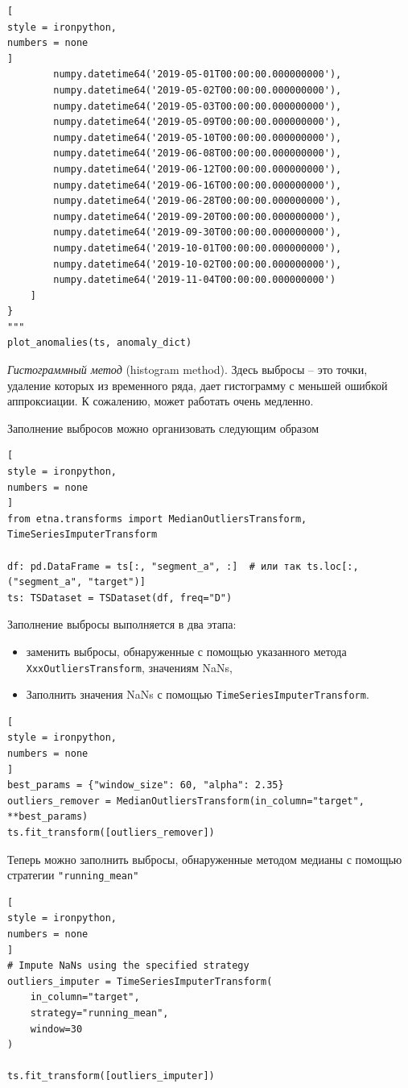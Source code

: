 \documentclass[%
	11pt,
	a4paper,
	utf8,
		]{article}
\begin{document}
\begin{lstlisting}[
style = ironpython,
numbers = none
]
		numpy.datetime64('2019-05-01T00:00:00.000000000'),
		numpy.datetime64('2019-05-02T00:00:00.000000000'),
		numpy.datetime64('2019-05-03T00:00:00.000000000'),
		numpy.datetime64('2019-05-09T00:00:00.000000000'),
		numpy.datetime64('2019-05-10T00:00:00.000000000'),
		numpy.datetime64('2019-06-08T00:00:00.000000000'),
		numpy.datetime64('2019-06-12T00:00:00.000000000'),
		numpy.datetime64('2019-06-16T00:00:00.000000000'),
		numpy.datetime64('2019-06-28T00:00:00.000000000'),
		numpy.datetime64('2019-09-20T00:00:00.000000000'),
		numpy.datetime64('2019-09-30T00:00:00.000000000'),
		numpy.datetime64('2019-10-01T00:00:00.000000000'),
		numpy.datetime64('2019-10-02T00:00:00.000000000'),
		numpy.datetime64('2019-11-04T00:00:00.000000000')
    ]
}
"""
plot_anomalies(ts, anomaly_dict)
\end{lstlisting}

\emph{Гистограммный метод} (histogram method). Здесь выбросы -- это точки, удаление которых из временного ряда, дает гистограмму с меньшей ошибкой аппроксиации. {\color{red}К сожалению, может работать очень медленно.}

Заполнение выбросов можно организовать следующим образом
\begin{lstlisting}[
style = ironpython,
numbers = none
]
from etna.transforms import MedianOutliersTransform, TimeSeriesImputerTransform

df: pd.DataFrame = ts[:, "segment_a", :]  # или так ts.loc[:, ("segment_a", "target")]
ts: TSDataset = TSDataset(df, freq="D")
\end{lstlisting}

Заполнение выбросы выполняется в два этапа:
\begin{itemize}
	\item заменить выбросы, обнаруженные с помощью указанного метода \verb|XxxOutliersTransform|, значениям NaNs,
	
	\item Заполнить значения NaNs с помощью \verb|TimeSeriesImputerTransform|.
\end{itemize}

\begin{lstlisting}[
style = ironpython,
numbers = none
]
best_params = {"window_size": 60, "alpha": 2.35}
outliers_remover = MedianOutliersTransform(in_column="target", **best_params)
ts.fit_transform([outliers_remover])
\end{lstlisting}

Теперь можно заполнить выбросы, обнаруженные методом медианы с помощью стратегии \verb|"running_mean"|
\begin{lstlisting}[
style = ironpython,
numbers = none
]
# Impute NaNs using the specified strategy
outliers_imputer = TimeSeriesImputerTransform(
    in_column="target",
    strategy="running_mean",
    window=30
)

ts.fit_transform([outliers_imputer])
\end{lstlisting}
\end{document}
